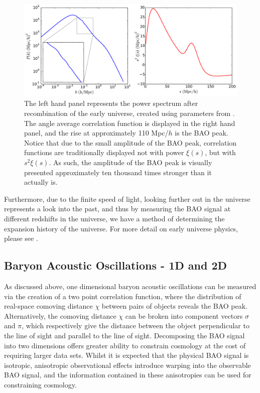 \documentclass[titlesmallcaps, examinerscopy, copyrightpage]{uqthesis}
\begin{document}
\begin{figure}[h!]
  \begin{center}
    \includegraphics[width=\textwidth]{images/Backgroundpk2xi.pdf}
  \end{center}
  \caption{The left hand panel represents the power spectrum after recombination of the early universe, created using parameters from \citet{Planck201416}. The angle average correlation function is displayed in the right hand panel, and the rise at approximately 110 Mpc/$h$ is the BAO peak. Notice that due to the small amplitude of the BAO peak, correlation functions are traditionally displayed not with power $\xi(s)$, but with $s^2 \xi(s)$. As such, the amplitude of the BAO peak is visually presented approximately ten thousand times stronger than it actually is.}
  \label{fig:Backgroundpk2xi}
\end{figure}



Furthermore, due to the finite speed of light, looking further out in the universe represents a look into the past, and thus by measuring the BAO signal at different redshifts in the universe, we have a method of determining the expansion history of the universe. For more detail on early universe physics, please see \citet{BashinskyBertschinger2001,BashinskyBertschinger2002}.



\subsection{Baryon Acoustic Oscillations - 1D and 2D}

As discussed above, one dimensional baryon acoustic oscillations can be measured via the creation of a two point correlation function, where the distribution of real-space comoving distance $\chi$ between pairs of objects reveals the BAO peak. Alternatively, the comoving distance $\chi$ can be broken into component vectors $\sigma$ and $\pi$, which respectively give the distance between the object perpendicular to the line of sight and parallel to the line of sight. Decomposing the BAO signal into two dimensions offers greater ability to constrain cosmology at the cost of requiring larger data sets. Whilst it is expected that the physical BAO signal is isotropic, anisotropic observational effects introduce warping into the observable BAO signal, and the information contained in these anisotropies can be used for constraining cosmology. \\
\end{document}
